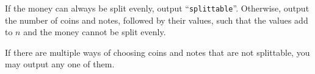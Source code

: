 
    If the money can always be split evenly, output ``\texttt{splittable}''.
    Otherwise, output the number of
    coins and notes, followed by their values, such that the values add to $n$
    and the money cannot be split evenly.

    If there are multiple ways of choosing coins and notes that are not splittable, you may output any one of them.
